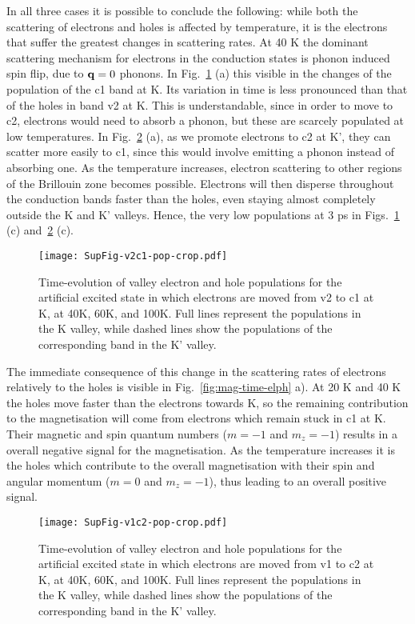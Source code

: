 \documentclass[prb,aps,superscriptaddress,reprint,floatfix]{revtex4-1}
\begin{document}
In all three cases it is possible to conclude the following: while both the scattering of electrons and holes is affected by temperature, it is the electrons that suffer the greatest changes in scattering rates. At 40 K the dominant scattering mechanism for electrons in the conduction states is phonon induced spin flip, due to ${\mathbf q} = 0$ phonons. In Fig.~\ref{fig:valley-occ-v2-c1} (a) this visible in the changes of the population of the c1 band at K. Its variation in time is less pronounced than that of the holes in band v2 at K. This is understandable, since in order to move to c2, electrons would need to absorb a phonon, but these are scarcely populated at low temperatures. In Fig.~\ref{fig:valley-occ-v1-c2} (a), as we promote electrons to c2 at K', they can scatter more easily to c1, since this would involve emitting a phonon instead of absorbing one. As the temperature increases, electron scattering to other regions of the Brillouin zone becomes possible. Electrons will then disperse throughout the conduction bands faster than the holes, even staying almost completely outside the K and K' valleys. Hence, the very low populations at 3 ps in Figs.~\ref{fig:valley-occ-v2-c1} (c) and~\ref{fig:valley-occ-v1-c2} (c).

\begin{figure}[ht]
\texttt{[image: SupFig-v2c1-pop-crop.pdf]}
\caption{Time-evolution of valley electron and hole populations for the artificial excited state in which electrons are moved from v2 to c1 at K, at 40K, 60K, and 100K. Full lines represent the populations in the K valley, while dashed lines show the populations of the corresponding band in the K' valley.}
\label{fig:valley-occ-v2-c1}
\end{figure}

The immediate consequence of this change in the scattering rates of electrons relatively to the holes is visible in Fig.~\ref{fig:mag-time-elph} a). At 20 K and 40 K the holes move faster than the electrons towards K, so the remaining contribution to the magnetisation will come from electrons which remain stuck in c1 at K. Their magnetic and spin quantum numbers ($m = -1$ and $m_z = -1$) results in a overall negative signal for the magnetisation. As the temperature increases it is the holes which contribute to the overall magnetisation with their spin and angular momentum ($m = 0$ and $m_z = -1$), thus leading to an overall positive signal.

\begin{figure}[ht]
\texttt{[image: SupFig-v1c2-pop-crop.pdf]}
\caption{Time-evolution of valley electron and hole populations for the artificial excited state in which electrons are moved from v1 to c2 at K, at 40K, 60K, and 100K. Full lines represent the populations in the K valley, while dashed lines show the populations of the corresponding band in the K' valley.}
\label{fig:valley-occ-v1-c2}
\end{figure}
\end{document}
